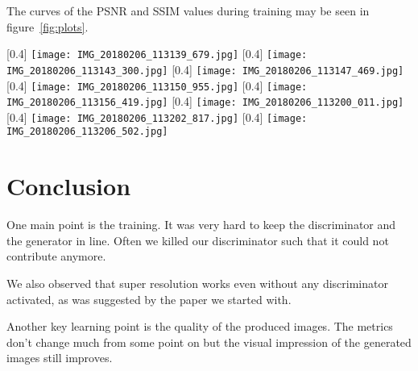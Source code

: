 \documentclass[10pt,twocolumn,letterpaper]{article}
\begin{document}
The curves of the PSNR and SSIM values during training may be seen in
figure~\ref{fig:plots}.
\begin{figure*}[h]
  \centering
  \captionsetup{}
  \subcaptionbox{}[0.4\linewidth]{%
    \texttt{[image: IMG\_20180206\_113139\_679.jpg]}
  }
  \subcaptionbox{}[0.4\linewidth]{%
    \texttt{[image: IMG\_20180206\_113143\_300.jpg]}
  }
  \subcaptionbox{}[0.4\linewidth]{%
    \texttt{[image: IMG\_20180206\_113147\_469.jpg]}
  }
  \subcaptionbox{}[0.4\linewidth]{%
    \texttt{[image: IMG\_20180206\_113150\_955.jpg]}
  }
  \subcaptionbox{}[0.4\linewidth]{%
    \texttt{[image: IMG\_20180206\_113156\_419.jpg]}
  }
  \subcaptionbox{}[0.4\linewidth]{%
    \texttt{[image: IMG\_20180206\_113200\_011.jpg]}
  }
  \subcaptionbox{}[0.4\linewidth]{%
    \texttt{[image: IMG\_20180206\_113202\_817.jpg]}
  }
  \subcaptionbox{}[0.4\linewidth]{%
    \texttt{[image: IMG\_20180206\_113206\_502.jpg]}
  }  
  \caption{Curves of metrics during training}
  \label{fig:plots}
\end{figure*}

\section{Conclusion}
\label{sec:conclusion}
One main point is the training. It was very hard to keep the
discriminator and the generator in line. Often we killed our
discriminator such that it could not contribute anymore.

We also observed that super resolution works even without any
discriminator activated, as was suggested by the paper we started
with.

Another key learning point is the quality of the produced images. The
metrics don't change much from some point on but the visual impression
of the generated images still improves.





\appendix

{
  \nocite{*}                      %
  \small
  
  
  
}
\end{document}
